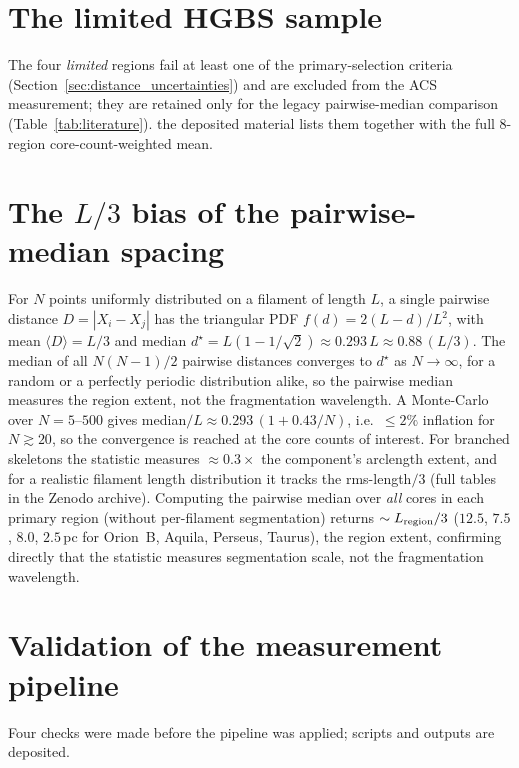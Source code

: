 \documentclass[usenatbib,twoside,twocolumn]{mnras}
\begin{document}

\appendix

\section{The limited HGBS sample}
\label{sec:limited_sample}
The four \emph{limited} regions fail at least one of the primary-selection criteria (Section~\ref{sec:distance_uncertainties}) and are excluded from the ACS measurement; they are retained only for the legacy pairwise-median comparison (Table~\ref{tab:literature}). the deposited material lists them together with the full 8-region core-count-weighted mean.



\section{The $L/3$ bias of the pairwise-median spacing}
\label{sec:pwmedian}
For $N$ points uniformly distributed on a filament of length $L$, a single pairwise distance $D=|X_i-X_j|$ has the triangular PDF $f(d)=2(L-d)/L^2$, with mean $\langle D\rangle=L/3$ and median $d^\star=L(1-1/\sqrt{2})\approx0.293\,L\approx0.88\,(L/3)$. The median of all $N(N-1)/2$ pairwise distances converges to $d^\star$ as $N\to\infty$, for a random or a perfectly periodic distribution alike, so the pairwise median measures the region extent, not the fragmentation wavelength. A Monte-Carlo over $N=5$--$500$ gives median$/L\approx0.293\,(1+0.43/N)$, i.e.\ $\le2\%$ inflation for $N\gtrsim20$, so the convergence is reached at the core counts of interest. For branched skeletons the statistic measures $\approx0.3\times$ the component's arclength extent, and for a realistic filament length distribution it tracks the rms-length$/3$ (full tables in the Zenodo archive). Computing the pairwise median over \emph{all} cores in each primary region (without per-filament segmentation) returns $\sim L_{\rm region}/3$ ($12.5$, $7.5$, $8.0$, $2.5$\,pc for Orion~B, Aquila, Perseus, Taurus), the region extent, confirming directly that the statistic measures segmentation scale, not the fragmentation wavelength.

\section{Validation of the measurement pipeline}
\label{sec:validation}

Four checks were made before the pipeline was applied; scripts and outputs are deposited.
\end{document}
